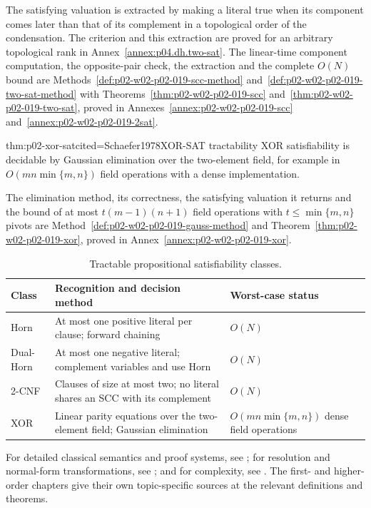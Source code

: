 The satisfying valuation is extracted by making a literal true when its
component comes later than that of its complement in a topological order of
the condensation.  The criterion and this extraction are proved for an
arbitrary topological rank in Annex~\ref{annex:p04.dh.two-sat}.  The
linear-time component computation, the opposite-pair check, the extraction
and the complete \(O(N)\) bound are
Methods~\ref{def:p02-w02-p02-019-scc-method}
and~\ref{def:p02-w02-p02-019-two-sat-method} with
Theorems~\ref{thm:p02-w02-p02-019-scc}
and~\ref{thm:p02-w02-p02-019-two-sat}, proved in
Annexes~\ref{annex:p02-w02-p02-019-scc} and~\ref{annex:p02-w02-p02-019-2sat}.

\begin{hbtheorem}{thm:p02-xor-sat}{cited=Schaefer1978}{XOR-SAT tractability}
XOR satisfiability is decidable by Gaussian elimination over the two-element
field, for example in \(O(mn\min\{m,n\})\) field operations with a dense
implementation.
\end{hbtheorem}

The elimination method, its correctness, the satisfying valuation it
returns and the bound of at most \(t(m-1)(n+1)\) field operations with
\(t\leq\min\{m,n\}\) pivots are
Method~\ref{def:p02-w02-p02-019-gauss-method} and
Theorem~\ref{thm:p02-w02-p02-019-xor}, proved in
Annex~\ref{annex:p02-w02-p02-019-xor}.

\begin{table}[tp]
\centering
\small
\begin{tabular}{@{}p{}p{}p{}@{}}
\toprule
Class & Recognition and decision method & Worst-case status \\
\midrule
Horn & At most one positive literal per clause; forward chaining & \(O(N)\) \\
Dual-Horn & At most one negative literal; complement variables and use Horn & \(O(N)\) \\
2-CNF & Clauses of size at most two; no literal shares an SCC with its complement & \(O(N)\) \\
XOR & Linear parity equations over the two-element field; Gaussian elimination & \(O(mn\min\{m,n\})\) dense field operations \\
\bottomrule
\end{tabular}
\caption{Tractable propositional satisfiability classes.}
\label{tab:p02-tractable-sat}
\end{table}

For detailed classical semantics and proof systems, see
\cite{EbbinghausFlumThomas1994,OpenLogic2026,Kleene1952}; for resolution and
normal-form transformations, see
\cite{Robinson1965,BaazEglyLeitsch2001}; and for complexity, see
\cite{Cook1971,AroraBarak2009}.  The first- and higher-order chapters give
their own topic-specific sources at the relevant definitions and theorems.
